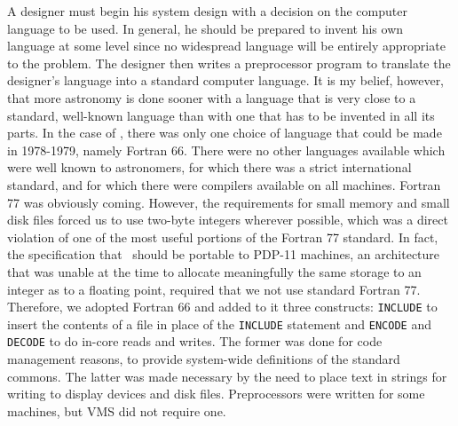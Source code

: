      A designer must begin his system design with a decision on the
computer language to be used.  In general, he should be prepared to
invent his own language at some level since no widespread language
will be entirely appropriate to the problem.  The designer then
writes a preprocessor program to translate the designer's language
into a standard computer language.  It is my belief, however, that more
astronomy is done sooner with a language that is very close to a
standard, well-known language than with one that has to be invented
in all its parts.  In the case of \AIPS, there was only one choice of
language that could be made in 1978-1979, namely Fortran 66.  There
were no other languages available which were well known to astronomers,
for which there was a strict international standard, and for which there
were compilers available on all machines.  Fortran 77 was obviously
coming.  However, the requirements for small memory and small disk
files forced us to use two-byte integers wherever possible, which
was a direct violation of one of the most useful portions of the
Fortran 77 standard.  In fact, the specification that \AIPS\ should
be portable to PDP-11 machines, an architecture that was unable at
the time to allocate meaningfully the same storage to an integer as
to a floating point, required that we not use standard Fortran 77.
Therefore, we adopted Fortran 66 and added to it three constructs:
{\tt INCLUDE} to insert the contents of a file in place of the
{\tt INCLUDE} statement and {\tt ENCODE} and {\tt DECODE} to do
in-core reads and writes.  The former was done for code management reasons,
to provide system-wide definitions of the standard commons.  The
latter was made necessary by the need to place text in strings for
writing to display devices and disk files.  Preprocessors were written
for some machines, but VMS did not require one.

